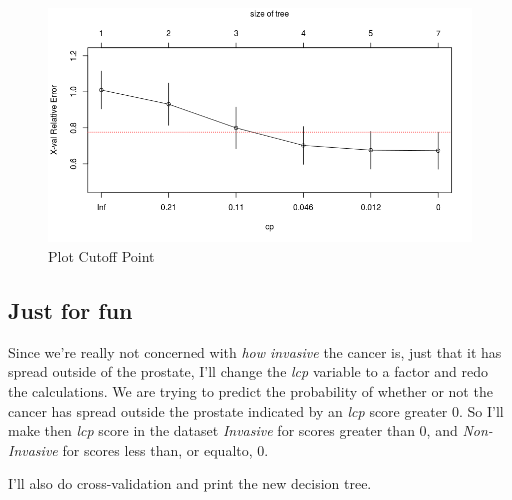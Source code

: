 \documentclass[]{article}
\newenvironment{Shaded}{\begin{snugshade}}{\end{snugshade}}
\newcommand{\KeywordTok}[1]{\textcolor[rgb]{0.13,0.29,0.53}{\textbf{#1}}}
\newcommand{\DataTypeTok}[1]{\textcolor[rgb]{0.13,0.29,0.53}{#1}}
\newcommand{\DecValTok}[1]{\textcolor[rgb]{0.00,0.00,0.81}{#1}}
\newcommand{\FloatTok}[1]{\textcolor[rgb]{0.00,0.00,0.81}{#1}}
\newcommand{\StringTok}[1]{\textcolor[rgb]{0.31,0.60,0.02}{#1}}
\newcommand{\ControlFlowTok}[1]{\textcolor[rgb]{0.13,0.29,0.53}{\textbf{#1}}}
\newcommand{\OperatorTok}[1]{\textcolor[rgb]{0.81,0.36,0.00}{\textbf{#1}}}
\newcommand{\NormalTok}[1]{#1}
\renewcommand{\&}{and}
\begin{document}
\begin{figure}[htb]
\caption{Plot Cutoff Point}
\vspace{0.2cm}
\includegraphics{plotcp.png}
\end{figure}

\subsection{Just for fun}\label{just-for-fun}

Since we're really not concerned with \emph{how invasive} the cancer is,
just that it has spread outside of the prostate, I'll change the
\emph{lcp} variable to a factor and redo the calculations. We are trying
to predict the probability of whether or not the cancer has spread
outside the prostate indicated by an \emph{lcp} score greater 0. So I'll
make then \emph{lcp} score in the dataset \emph{Invasive} for scores
greater than 0, and \emph{Non-Invasive} for scores less than, or
equalto, 0.

I'll also do cross-validation and print the new decision tree.

\begin{Shaded}
\end{Shaded}
\end{document}
